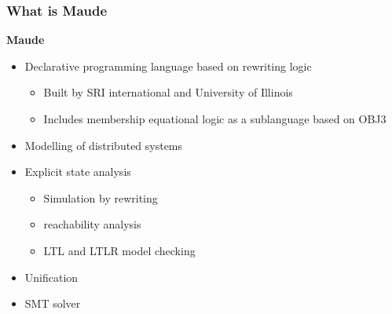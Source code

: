 \documentclass{beamer}
\begin{document}
\begin{frame}
    \frametitle{What is Maude}
    \textbf{Maude}
    \begin{itemize}
        \item Declarative programming language based on rewriting logic 
        \begin{itemize}
            \item Built by SRI international and University of Illinois
            \item Includes membership equational logic as a sublanguage based on OBJ3 
        \end{itemize}
        
        \item Modelling of distributed systems 
        \item  Explicit state analysis 
        \begin{itemize}
            \item Simulation by rewriting 
            \item reachability analysis 
            \item LTL and LTLR model checking 
        \end{itemize}
        \item Unification 
        \item SMT solver
    \end{itemize}
\end{frame}
\end{document}
